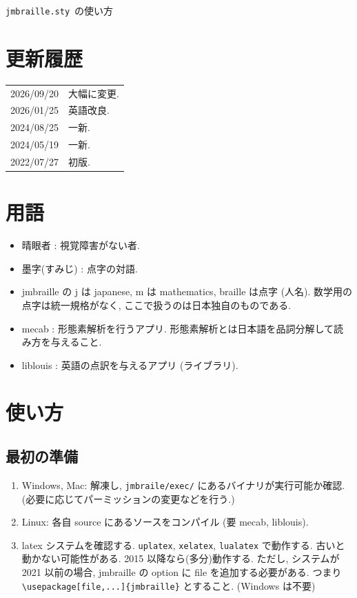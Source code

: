 \documentclass[lualatex,ja=standard,jafont=haranoaji]{bxjsarticle}
\def\Msty{\texttt{jmbraille.sty}}
\begin{document}
%
\BrailleFigurePlotOn
{\LARGE \Msty\ の使い方}\\

\section{更新履歴}

\begin{tabular}{cl}
  2026/09/20 & 大幅に変更. \\
  2026/01/25 & 英語改良. \\
  2024/08/25 & 一新. \\
  2024/05/19 & 一新. \\
  2022/07/27 & 初版.
\end{tabular}

\section{用語}
\begin{itemize}
\item 晴眼者 : 視覚障害がない者.
\item 墨字(すみじ) : 点字の対語.
\item jmbraille の j は japanese, m は mathematics, braille は点字 (人名).
数学用の点字は統一規格がなく, ここで扱うのは日本独自のものである.
\item mecab : 形態素解析を行うアプリ. 形態素解析とは日本語を品詞分解して読み方を与えること.
\item liblouis : 英語の点訳を与えるアプリ (ライブラリ).
\end{itemize}

\section{使い方}
\subsection{最初の準備}
\begin{enumerate}
\item Windows, Mac: 解凍し, \verb|jmbraile/exec/| にあるバイナリが実行可能か確認.  (必要に応じてパーミッションの変更などを行う.) 
\item Linux: 各自 source にあるソースをコンパイル (要 mecab, liblouis).
\item latex システムを確認する. \verb|uplatex|, \verb|xelatex|, \verb|lualatex| で動作する. 古いと動かない可能性がある.
  2015 以降なら(多分)動作する.  ただし, システムが 2021 以前の場合, jmbraille の option に file を追加する必要がある. つまり \verb|\usepackage[file,...]{jmbraille}| とすること. (Windows は不要)
\end{enumerate}
\end{document}
